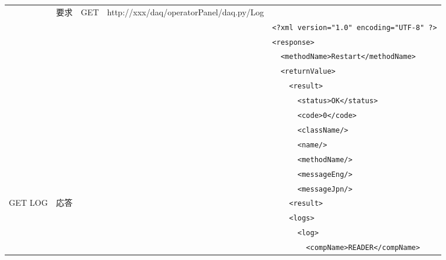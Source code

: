 \documentclass[a4j,10pt,dvips,onecolumn,oneside,final]{jarticle}%
\begin{document}
\begin{table}[htbp]
\begin{center}
{\begin{tabular}{|l|c|c|c|l|}
                  & 要求      & GET  & http://xxx/daq/operatorPanel/daq.py/Log    & \\ \cline{2-5}
                  &           &      &                                            & \verb|<?xml version="1.0" encoding="UTF-8" ?>|\\
                  &           &      &                                            & \verb|<response>|\\ 
                  &           &      &                                            & \verb|  <methodName>Restart</methodName>|\\ 
                  &           &      &                                            & \verb|  <returnValue>|\\ 
                  &           &      &                                            & \verb|    <result>|\\ 
                  &           &      &                                            & \verb|      <status>OK</status>|\\ 
                  &           &      &                                            & \verb|      <code>0</code>|\\ 
                  &           &      &                                            & \verb|      <className/>|\\ 
                  &           &      &                                            & \verb|      <name/>|\\ 
                  &           &      &                                            & \verb|      <methodName/>|\\ 
                  &           &      &                                            & \verb|      <messageEng/>|\\ 
                  &           &      &                                            & \verb|      <messageJpn/>|\\ 
    GET LOG       & 応答      &      &                                            & \verb|    <result>|\\
                  &           &      &                                            & \verb|    <logs>|\\
                  &           &      &                                            & \verb|      <log>|\\
                  &           &      &                                            & \verb|        <compName>READER</compName>|\\

\end{tabular}}
\end{center}
\end{table}
\end{document}
